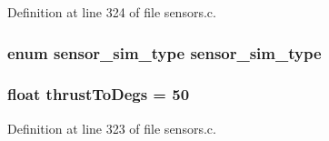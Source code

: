 Definition at line 324 of file sensors.\-c.

\hypertarget{group___sensors_gaa5e76bc9bc1cc20d2b183069aea687b4}{
\subsubsection[{sensor\-\_\-sim\-\_\-type}]{\setlength{\rightskip}{0pt plus 5cm}enum {\bf sensor\-\_\-sim\-\_\-type}  {\bf sensor\-\_\-sim\-\_\-type}}}\label{group___sensors_gaa5e76bc9bc1cc20d2b183069aea687b4}
\hypertarget{group___sensors_ga0bfc1acfbf1c0b59ebaeba678cb8c811}{
\subsubsection[{thrust\-To\-Degs}]{\setlength{\rightskip}{0pt plus 5cm}float thrust\-To\-Degs = 50}}\label{group___sensors_ga0bfc1acfbf1c0b59ebaeba678cb8c811}


Definition at line 323 of file sensors.\-c.

